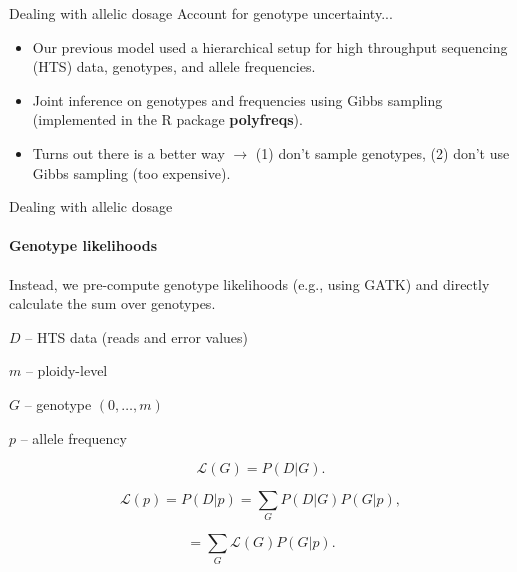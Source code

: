 \documentclass[presentation,sansserif]{beamer}
\begin{document}
\begin{frame}[t]{Dealing with allelic dosage}
	\pause
	\vspace{0.1in}
	Account for genotype uncertainty...
	\vspace{0.2in}

	\begin{itemize}
	\setlength\itemsep{0.2in}
		\item Our previous model used a hierarchical setup for high throughput sequencing (HTS) data, genotypes, and allele frequencies.
		\vspace{0.1in}
		\pause

		\item Joint inference on genotypes and frequencies using Gibbs sampling (implemented in the R package \textbf{polyfreqs}).
		\vspace{0.1in}
		\pause

		\item Turns out there is a better way \pause $\rightarrow$ (1) don't sample genotypes\pause, (2) don't use Gibbs sampling (too expensive).
		\vspace{0.1in}

	\end{itemize}

\end{frame}

\begin{frame}[t]{Dealing with allelic dosage}
	\framesubtitle{Genotype likelihoods}

	Instead, we pre-compute genotype likelihoods (e.g., using GATK) and directly calculate the sum over genotypes.
	\vspace{0.2in}
	\pause
	
	$D$ -- HTS data (reads and error values)
	
	$m$ -- ploidy-level
	
	$G$ -- genotype $(0,\dots,m)$
	
	$p$ -- allele frequency
	

	\pause
	\begin{equation*}
		\mathcal{L}(G) = P(D|G).
	\end{equation*}
	\vspace{-0.1in}
	
	\begin{equation*}
		\mathcal{L}(p) = P(D|p) = \sum_G P(D|G)P(G|p),
	\end{equation*}
	\vspace{-0.2in}
	\pause
	
	\begin{equation*}
		= \sum_G \mathcal{L}(G)P(G|p).
	\end{equation*}

\end{frame}
\end{document}

